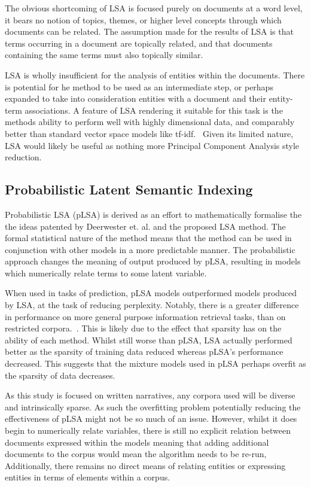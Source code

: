 \documentclass[10pt]{report}
\begin{document}
The obvious shortcoming of LSA is focused purely on documents at a word level, it bears no notion of topics, themes, or higher level concepts through which documents can be related. The assumption made for the results of LSA is that terms occurring in a document are topically related, and that documents containing the same terms must also topically similar.

LSA is wholly insufficient for the analysis of entities within the documents. There is potential for he method to be used as an intermediate step, or perhaps expanded to take into consideration entities with a document and their entity-term associations. A feature of LSA rendering it suitable for this task is the methods ability to perform well with highly dimensional data, and comparably better than standard vector space models like tf-idf.~\cite{Kumar2004-da} Given its limited nature, LSA would likely be useful as nothing more Principal Component Analysis style reduction.

\subsection{Probabilistic Latent Semantic Indexing}
Probabilistic LSA (pLSA) is derived as an effort to mathematically formalise the the ideas patented by Deerwester et. al. and the proposed LSA method. The formal statistical nature of the method means that the method can be used in conjunction with other models in a more predictable manner. The probabilistic approach changes the meaning of output produced by pLSA, resulting in models which numerically relate terms to some latent variable. 

When used in tasks of prediction, pLSA models outperformed models produced by LSA, at the task of reducing perplexity. Notably, there is a greater difference in performance on more general purpose information retrieval tasks, than on restricted corpora.~\cite{Hofmann1999-qb}. This is likely due to the effect that sparsity has on the ability of each method. Whilst still worse than pLSA, LSA actually performed better as the sparsity of training data reduced whereas pLSA’s performance decreased. This suggests that the mixture models used in pLSA perhaps overfit as the sparsity of data decreases.

As this study is focused on written narratives, any corpora used will be diverse and intrinsically sparse. As such the overfitting problem potentially reducing the effectiveness of pLSA might not be so much of an issue. However, whilst it does begin to numerically relate variables, there is still no explicit relation between documents expressed within the models meaning that adding additional documents to the corpus would mean the algorithm needs to be re-run, Additionally, there remains no direct means of relating entities or expressing entities in terms of elements within a corpus.
\end{document}
